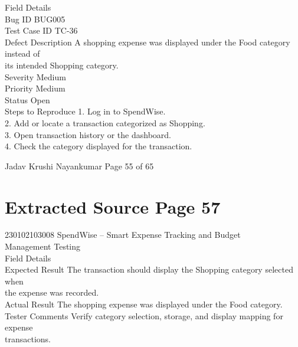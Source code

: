 \documentclass[12pt,a4paper]{report}
\begin{document}
\smallskip
Field                 Details\\ 
Bug ID                BUG005\\ 
Test Case ID          TC-36\\ 
Defect Description    A shopping expense was displayed under the Food category instead of\\ 
its intended Shopping category.\\ 
Severity              Medium\\ 
Priority              Medium\\ 
Status                Open\\ 
Steps to Reproduce    1. Log in to SpendWise.\\ 
2. Add or locate a transaction categorized as Shopping.\\ 
3. Open transaction history or the dashboard.\\ 
4. Check the category displayed for the transaction.\\ 

\smallskip

\smallskip

\smallskip

\smallskip
Jadav Krushi Nayankumar                                                           Page 55 of 65\\ 

\clearpage
\section*{Extracted Source Page 57}
230102103008                            SpendWise – Smart Expense Tracking and Budget\\ 
Management Testing\\ 

\smallskip
Field                 Details\\ 
Expected Result       The transaction should display the Shopping category selected when\\ 
the expense was recorded.\\ 
Actual Result         The shopping expense was displayed under the Food category.\\ 
Tester Comments       Verify category selection, storage, and display mapping for expense\\ 
transactions.\\ 

\smallskip

\smallskip

\smallskip
\end{document}
